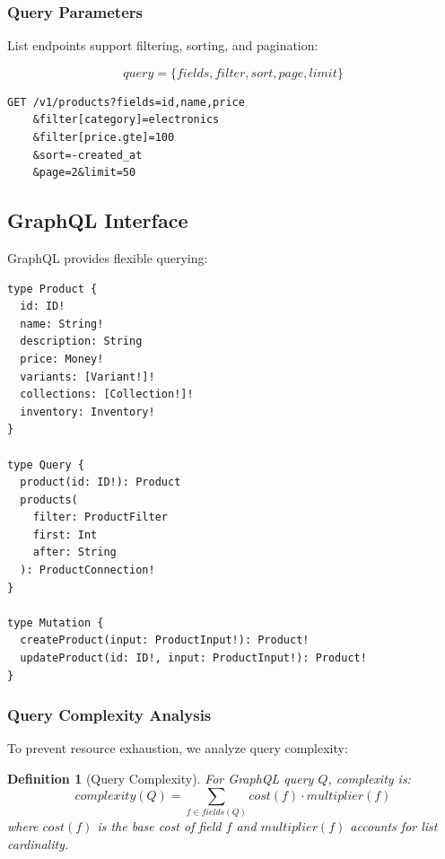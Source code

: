 \documentclass[11pt,a4paper]{article}
\newtheorem{definition}[theorem]{Definition}
\begin{document}
\subsubsection{Query Parameters}

List endpoints support filtering, sorting, and pagination:

\begin{equation}
query = \{fields, filter, sort, page, limit\}
\end{equation}

\begin{lstlisting}[caption=REST Query Example]
GET /v1/products?fields=id,name,price
    &filter[category]=electronics
    &filter[price.gte]=100
    &sort=-created_at
    &page=2&limit=50
\end{lstlisting}

\subsection{GraphQL Interface}

GraphQL provides flexible querying:

\begin{lstlisting}[caption=GraphQL Schema Excerpt]
type Product {
  id: ID!
  name: String!
  description: String
  price: Money!
  variants: [Variant!]!
  collections: [Collection!]!
  inventory: Inventory!
}

type Query {
  product(id: ID!): Product
  products(
    filter: ProductFilter
    first: Int
    after: String
  ): ProductConnection!
}

type Mutation {
  createProduct(input: ProductInput!): Product!
  updateProduct(id: ID!, input: ProductInput!): Product!
}
\end{lstlisting}

\subsubsection{Query Complexity Analysis}

To prevent resource exhaustion, we analyze query complexity:

\begin{definition}[Query Complexity]
For GraphQL query $Q$, complexity is:
\begin{equation}
complexity(Q) = \sum_{f \in fields(Q)} cost(f) \cdot multiplier(f)
\end{equation}
where $cost(f)$ is the base cost of field $f$ and $multiplier(f)$ accounts for list cardinality.
\end{definition}
\end{document}
